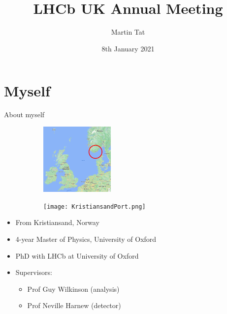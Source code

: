 \documentclass{beamer}
\title[LHCb UK Annual Meeting]{LHCb UK Annual Meeting}
\author{Martin Tat}
\institute{Oxford LHCb}
\date{8th January 2021}
\begin{document}
\begin{frame}
  \titlepage
\end{frame}


\section{Myself}
\begin{frame}{About myself}
  \begin{figure}
    \centering
    \begin{subfigure}{0.3\textwidth}
      \centering
      \includegraphics[width=\textwidth, height = 3.5cm]{KristiansandNorway.png}
    \end{subfigure}%
    \hspace{1cm}
    \begin{subfigure}{0.5\textwidth}
      \centering
      \texttt{[image: KristiansandPort.png]}
    \end{subfigure}
  \end{figure}
  \begin{itemize}
    \item{From Kristiansand, Norway}
    \item{4-year Master of Physics, University of Oxford}
    \item{PhD with LHCb at University of Oxford}
    \item{Supervisors:}
    \begin{itemize}
      \item{Prof Guy Wilkinson (analysis)}
      \item{Prof Neville Harnew (detector)}
    \end{itemize}
  \end{itemize}
\end{frame}
\end{document}
